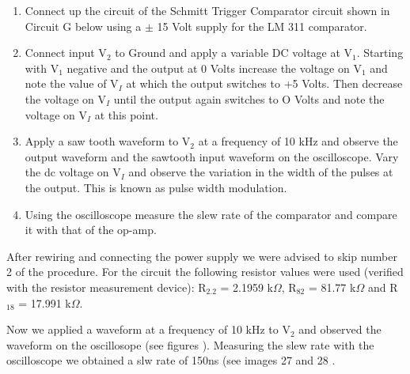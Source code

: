 \begin{enumerate}
	\item Connect up the circuit of the Schmitt Trigger Comparator circuit shown in Circuit G below using a $\pm$ 15 Volt supply for the LM 311 comparator.
\item Connect input V$_2$ to Ground and apply a variable DC voltage at V$_1$. Starting with V$_1$ negative and the output at 0 Volts increase the voltage on V$_1$ and note the value of V$_I$ at which the
output switches to +5 Volts. Then decrease the voltage on V$_I$ until the output again switches
to O Volts and note the voltage on V$_I$ at this point.

\item Apply a saw tooth waveform to V$_2$ at a frequency of 10 kHz and observe the output
waveform and the sawtooth input waveform on the oscilloscope. Vary the dc voltage on V$_I$
and observe the variation in the width of the pulses at the output. This is known as pulse
width modulation.

\item Using the oscilloscope measure the slew rate of the comparator and compare it with that of
the op-amp.
\end{enumerate}


After rewiring and connecting the power supply we were advised to skip number 2 of the procedure.
For the circuit the following resistor values were used (verified with the resistor measurement device): R$_{2.2}$ = 2.1959 k$\Omega$, R$_{82}$ = 81.77 k$\Omega$ and R$_{18}$ = 17.991 k$\Omega$.


Now we applied a waveform at a frequency of 10 kHz to V$_2$ and observed the waveform on the oscillosope (see figures ).
Measuring the slew rate with the oscilloscope we obtained a slw rate of 150ns (see images 27 and 28 .
%
%
%
%
%

